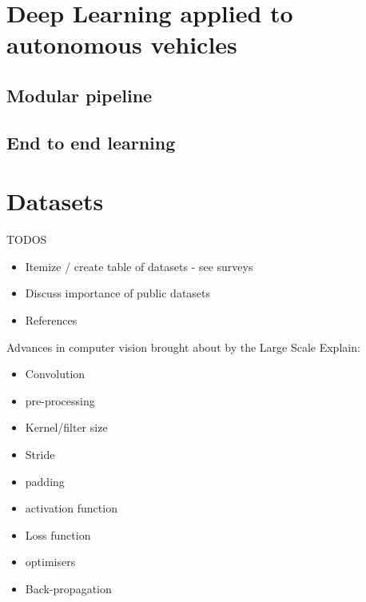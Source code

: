 
\section{Deep Learning applied to autonomous vehicles}

\subsection{Modular pipeline}

\subsection{End to end learning}



\lipsum[1]

\section{Datasets}

TODOS

\begin{itemize}
    \item Itemize / create table of datasets - see surveys
    \item Discuss importance of public datasets
    \item References
\end{itemize}

Advances in computer vision brought about by the Large Scale 
Explain:  
\begin{itemize}
    \item Convolution
    \item pre-processing
    \item Kernel/filter size
    \item Stride
    \item padding
    \item activation function
    \item Loss function
    \item optimisers
    \item Back-propagation
\end{itemize}


